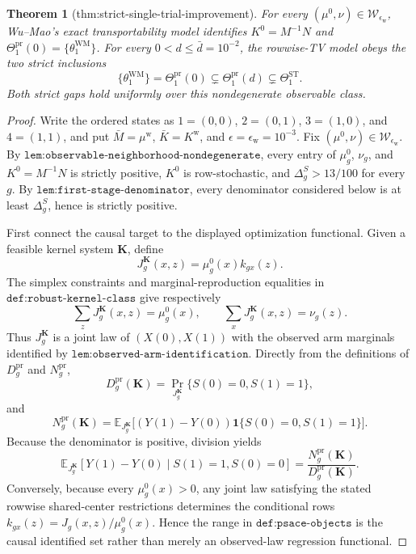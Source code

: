 \documentclass{article}
\newtheorem{theorem}{Theorem}
\begin{document}
\begin{theorem}[thm:strict-single-trial-improvement]\label{thm:strict-single-trial-improvement}
For every \((\mu^0,\nu)\in\mathcal W_{\epsilon_{\mathrm w}}\), Wu--Mao's exact transportability model identifies \(K^0=M^{-1}N\) and \(\Theta_1^{\mathrm{pr}}(0)=\{\theta_1^{\mathrm{WM}}\}\). For every \(0<d\le\bar d=10^{-2}\), the rowwise-TV model obeys the two strict inclusions \[\{\theta_1^{\mathrm{WM}}\}=\Theta_1^{\mathrm{pr}}(0)\subsetneq\Theta_1^{\mathrm{pr}}(d)\subsetneq\Theta_1^{\mathrm{ST}}.\] Both strict gaps hold uniformly over this nondegenerate observable class.
\end{theorem}
\begin{proof}
Write the ordered states as \(1=(0,0)\), \(2=(0,1)\), \(3=(1,0)\), and \(4=(1,1)\), and put \(\bar M=\mu^{\mathrm w}\), \(\bar K=K^{\mathrm w}\), and \(\epsilon=\epsilon_{\mathrm w}=10^{-3}\). Fix \((\mu^0,\nu)\in\mathcal W_{\epsilon_{\mathrm w}}\). By \(\texttt{lem:observable-neighborhood-nondegenerate}\), every entry of \(\mu_g^0\), \(\nu_g\), and \(K^0=M^{-1}N\) is strictly positive, \(K^0\) is row-stochastic, and \(\Delta_g^S>13/100\) for every \(g\). By \(\texttt{lem:first-stage-denominator}\), every denominator considered below is at least \(\Delta_g^S\), hence is strictly positive.

First connect the causal target to the displayed optimization functional. Given a feasible kernel system \(\mathbf K\), define
\[
 J_g^{\mathbf K}(x,z)=\mu_g^0(x)k_{gx}(z).
\]
The simplex constraints and marginal-reproduction equalities in \(\texttt{def:robust-kernel-class}\) give respectively
\[
 \sum_zJ_g^{\mathbf K}(x,z)=\mu_g^0(x),
 \qquad
 \sum_xJ_g^{\mathbf K}(x,z)=\nu_g(z).
\]
Thus \(J_g^{\mathbf K}\) is a joint law of \((X(0),X(1))\) with the observed arm marginals identified by \(\texttt{lem:observed-arm-identification}\). Directly from the definitions of \(D_g^{\mathrm{pr}}\) and \(N_g^{\mathrm{pr}}\),
\[
 D_g^{\mathrm{pr}}(\mathbf K)
 =\Pr_{J_g^{\mathbf K}}\{S(0)=0,S(1)=1\},
\]
and
\[
 N_g^{\mathrm{pr}}(\mathbf K)
 =\mathbb E_{J_g^{\mathbf K}}
 \bigl[(Y(1)-Y(0))\mathbf 1\{S(0)=0,S(1)=1\}\bigr].
\]
Because the denominator is positive, division yields
\[
 \mathbb E_{J_g^{\mathbf K}}
 [Y(1)-Y(0)\mid S(1)=1,S(0)=0]
 =\frac{N_g^{\mathrm{pr}}(\mathbf K)}{D_g^{\mathrm{pr}}(\mathbf K)}.
\]
Conversely, because every \(\mu_g^0(x)>0\), any joint law satisfying the stated rowwise shared-center restrictions determines the conditional rows \(k_{gx}(z)=J_g(x,z)/\mu_g^0(x)\). Hence the range in \(\texttt{def:psace-objects}\) is the causal identified set rather than merely an observed-law regression functional.


\end{proof}
\end{document}
